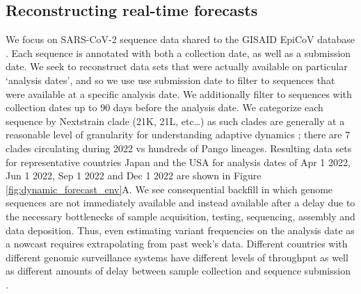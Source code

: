 \documentclass[11pt,oneside,letterpaper]{article}
\begin{document}
\subsection*{Reconstructing real-time forecasts}

We focus on SARS-CoV-2 sequence data shared to the GISAID EpiCoV database \cite{shu2017gisaid}.
Each sequence is annotated with both a collection date, as well as a submission date.
We seek to reconstruct data sets that were actually available on particular `analysis dates', and so we use use submission date to filter to sequences that were available at a specific analysis date.
We additionally filter to sequences with collection dates up to 90 days before the analysis date.
We categorize each sequence by Nextstrain clade (21K, 21L, etc\dots) as such clades are generally at a reasonable level of granularity for understanding adaptive dynamics \cite{bloom2023fitness}; there are 7 clades circulating during 2022 vs hundreds of Pango lineages.
Resulting data sets for representative countries Japan and the USA for analysis dates of Apr 1 2022, Jun 1 2022, Sep 1 2022 and Dec 1 2022 are shown in Figure \ref{fig:dynamic_forecast_env}A.
We see consequential backfill in which genome sequences are not immediately available and instead available after a delay due to the necessary bottlenecks of sample acquisition, testing, sequencing, assembly and data deposition.
Thus, even estimating variant frequencies on the analysis date as a nowcast requires extrapolating from past week's data.
Different countries with different genomic surveillance systems have different levels of throughput as well as different amounts of delay between sample collection and sequence submission \cite{brito2022global}.
\end{document}
